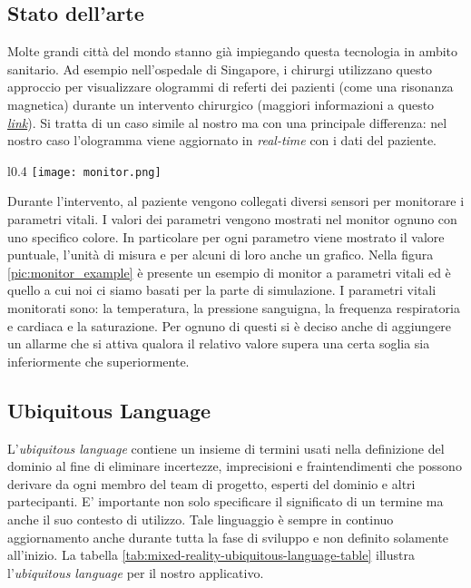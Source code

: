 \subsection{Stato dell'arte}
Molte grandi città del mondo stanno già impiegando questa tecnologia in ambito sanitario. Ad esempio nell'ospedale di Singapore, i chirurgi utilizzano questo approccio per visualizzare ologrammi di referti dei pazienti (come una risonanza magnetica) durante un intervento chirurgico (maggiori informazioni a questo \href{https://govinsider.asia/citizen-centric/how-a-singapore-hospital-uses-holograms-to-assist-surgery-nuhs-ngiam-kee-yuan/} {\textit{link}}). Si tratta di un caso simile al nostro ma con una principale differenza: nel nostro caso l'ologramma viene aggiornato in \textit{real-time} con i dati del paziente.\newline

\begin{wrapfigure}{l}{0.4\textwidth}
    \centering
    \texttt{[image: monitor.png]}
    \caption{Esempio di monitor a parametri vitali.}
    \label{pic:monitor_example}
\end{wrapfigure}

Durante l'intervento, al paziente vengono collegati diversi sensori per monitorare i parametri vitali. \newline I valori dei parametri vengono mostrati nel monitor ognuno con uno specifico colore. In particolare per ogni parametro viene mostrato il valore puntuale, l'unità di misura e per alcuni di loro anche un grafico. \newline Nella figura \ref{pic:monitor_example} è presente un esempio di monitor a parametri vitali ed è quello a cui noi ci siamo basati per la parte di simulazione. I parametri vitali monitorati sono: la temperatura, la pressione sanguigna, la frequenza respiratoria e cardiaca e la saturazione. Per ognuno di questi si è deciso anche di aggiungere un allarme che si attiva qualora il relativo valore supera una certa soglia sia inferiormente che superiormente.

\subsection{Ubiquitous Language}
L'\textit{ubiquitous language} contiene un insieme di termini usati nella definizione del dominio al fine di eliminare incertezze, imprecisioni e fraintendimenti che possono derivare da ogni membro del team di progetto, esperti del dominio e altri partecipanti. E' importante non solo specificare il significato di un termine ma anche il suo contesto di utilizzo. Tale linguaggio è sempre in continuo aggiornamento anche durante tutta la fase di sviluppo e non definito solamente all'inizio. \newline \newline La tabella \ref{tab:mixed-reality-ubiquitous-language-table} illustra l'\textit{ubiquitous language} per il nostro applicativo.

